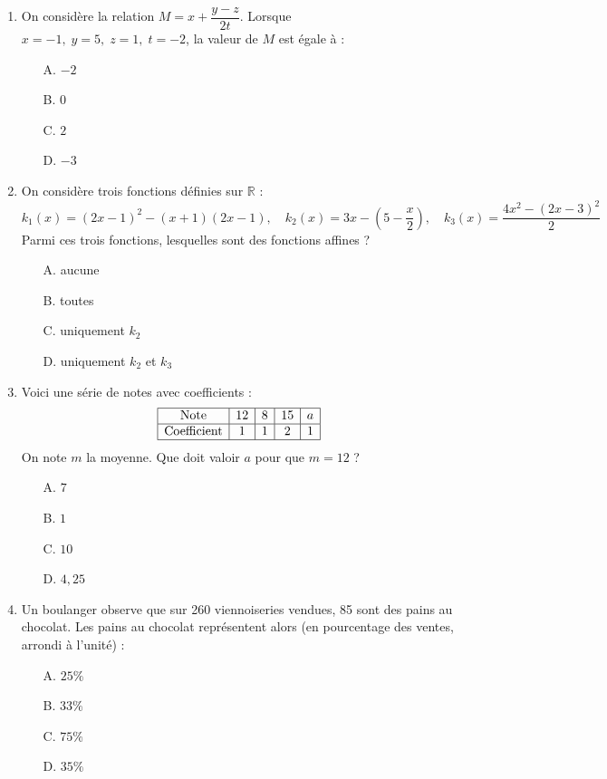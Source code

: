 \documentclass[a4paper,12pt]{article}
\begin{document}
\begin{enumerate}

\item On considère la relation \(M = x + \dfrac{y - z}{2t}\). Lorsque \(x = -1,\; y = 5,\; z = 1,\; t = -2\), la valeur de \(M\) est égale à :
\begin{itemize}
\item[A.] \(-2\)
\item[B.] \(0\)
\item[C.] \(2\)
\item[D.] \(-3\)
\end{itemize}

\item On considère trois fonctions définies sur \(\mathbb{R}\) :
\[k_1(x) = (2x-1)^2 - (x+1)(2x-1),\quad
k_2(x) = 3x - \left(5 - \frac{x}{2}\right),\quad
k_3(x) = \frac{4x^2 - (2x-3)^2}{2}\]
Parmi ces trois fonctions, lesquelles sont des fonctions affines ?
\begin{itemize}
\item[A.] aucune
\item[B.] toutes
\item[C.] uniquement \(k_2\)
\item[D.] uniquement \(k_2\) et \(k_3\)
\end{itemize}

\item Voici une série de notes avec coefficients :
\[
\begin{array}{|c|c|c|c|c|}
\hline
\text{Note} & 12 & 8 & 15 & a \\
\hline
\text{Coefficient} & 1 & 1 & 2 & 1 \\
\hline
\end{array}
\]
On note \(m\) la moyenne. Que doit valoir \(a\) pour que \(m = 12\) ?
\begin{itemize}
\item[A.] \(7\)
\item[B.] \(1\)
\item[C.] \(10\)
\item[D.] \(4{,}25\)
\end{itemize}

\item Un boulanger observe que sur 260 viennoiseries vendues, 85 sont des pains au chocolat. Les pains au chocolat représentent alors (en pourcentage des ventes, arrondi à l'unité) :
\begin{itemize}
\item[A.] \(25\%\)
\item[B.] \(33\%\)
\item[C.] \(75\%\)
\item[D.] \(35\%\)
\end{itemize}


\end{enumerate}
\end{document}
